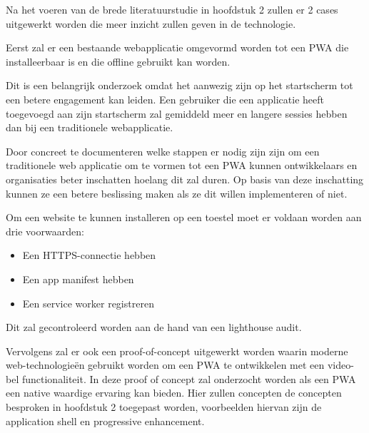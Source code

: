 Na het voeren van de brede literatuurstudie in hoofdstuk 2 zullen er 2 cases uitgewerkt worden die meer inzicht zullen geven in de technologie.




Eerst zal er een bestaande webapplicatie omgevormd worden tot een PWA die installeerbaar is en die offline gebruikt kan worden.

Dit is een belangrijk onderzoek omdat het aanwezig zijn op het startscherm tot een betere engagement kan leiden. Een gebruiker die een applicatie heeft toegevoegd aan zijn startscherm zal gemiddeld meer en langere sessies hebben dan bij een traditionele webapplicatie.
 \autocite{LePage2020b}

Door concreet te documenteren welke stappen er nodig zijn zijn om een traditionele web applicatie om te vormen tot een PWA kunnen ontwikkelaars en organisaties beter inschatten hoelang dit zal duren.
Op basis van deze inschatting kunnen ze een betere beslissing maken als ze dit willen implementeren of niet.

Om een website te kunnen installeren op een toestel moet er voldaan worden aan drie voorwaarden:
\begin{itemize}
	\item Een HTTPS-connectie hebben
	\item Een app manifest hebben
	\item Een service worker registreren
\end{itemize}

Dit zal gecontroleerd worden aan de hand van een lighthouse audit.
	
Vervolgens zal er ook een proof-of-concept uitgewerkt worden waarin moderne web-technologieën gebruikt worden om een PWA te ontwikkelen met een video-bel functionaliteit. In deze proof of concept zal onderzocht worden als een PWA een native waardige ervaring kan bieden. Hier zullen concepten de concepten besproken in hoofdstuk 2 toegepast worden, voorbeelden hiervan zijn de application shell en  progressive enhancement.





